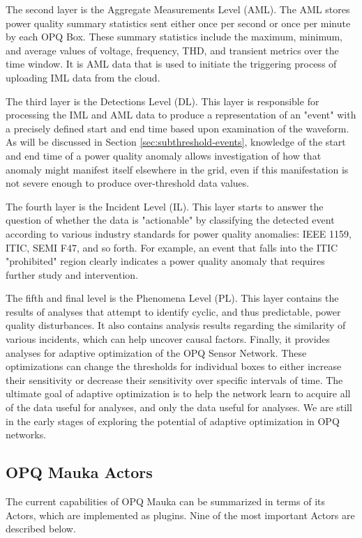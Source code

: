 The second layer is the Aggregate Measurements Level (AML). The AML stores power quality summary statistics sent either once per second or once per minute by each OPQ Box. These summary statistics include the maximum, minimum, and average values of voltage, frequency, THD, and transient metrics over the time window. It is AML data that is used to initiate the triggering process of uploading IML data from the cloud.

The third layer is the Detections Level (DL). This layer is responsible for processing the IML and AML data to produce a representation of an "event" with a precisely defined start and end time based upon examination of the waveform.  As will be discussed in Section \ref{sec:subthreshold-events}, knowledge of the start and end time of a power quality anomaly allows investigation of how that anomaly might manifest itself elsewhere in the grid, even if this manifestation is not severe enough to produce over-threshold data values.

The fourth layer is the Incident Level (IL).  This layer starts to answer the question of whether the data is "actionable" by classifying the detected event according to various industry standards for power quality anomalies: IEEE 1159, ITIC, SEMI F47, and so forth.  For example, an event that falls into the ITIC "prohibited" region clearly indicates a power quality anomaly that requires further study and intervention.

The fifth and final level is the Phenomena Level (PL). This layer contains the results of analyses that attempt to identify cyclic, and thus predictable, power quality disturbances. It also contains analysis results regarding the similarity of various incidents, which can help uncover causal factors.  Finally, it provides analyses for adaptive optimization of the OPQ Sensor Network. These optimizations can change the thresholds for individual boxes to either increase their sensitivity or decrease their sensitivity over specific intervals of time. The ultimate goal of adaptive optimization is to help the network learn to acquire all of the data useful for analyses, and only the data useful for analyses.  We are still in the early stages of exploring the potential of adaptive optimization in OPQ networks.

\subsection{OPQ Mauka Actors}

The current capabilities of OPQ Mauka can be summarized in terms of its Actors, which are implemented as plugins. Nine of the most important Actors are described below.

